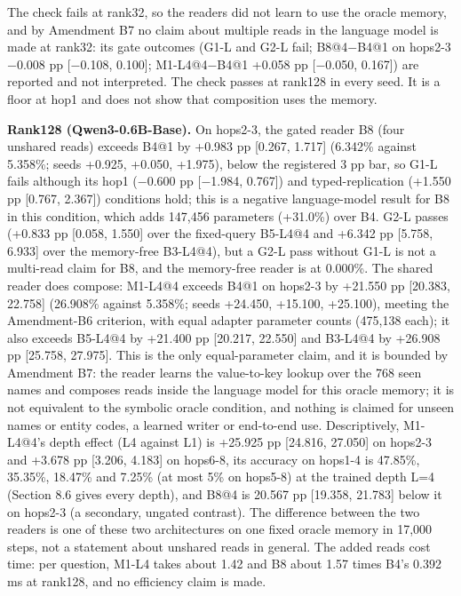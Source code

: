  The check fails at rank32, so the readers did not learn to use the oracle memory, and by Amendment B7 no claim about  %
multiple reads in the language model is made at rank32: its gate outcomes (G1-L and G2-L fail; B8@4\ensuremath{-}B4@1 on hops2-3
\ensuremath{-}0.008 pp [\ensuremath{-}0.108, 0.100]; M1-L4@4\ensuremath{-}B4@1 +0.058 pp [\ensuremath{-}0.050, 0.167]) are reported and not interpreted.  %
The check passes at rank128 in every seed. It is a floor at hop1 and does not show that composition uses the memory.  %

\textbf{Rank128 (Qwen3-0.6B-Base).} On hops2-3, the gated reader B8 (four unshared reads) exceeds B4@1 by +0.983 pp [0.267, 1.717] (6.342\% against
5.358\%; seeds +0.925, +0.050, +1.975), below the registered 3 pp bar, so G1-L fails although its hop1 (\ensuremath{-}0.600 pp
[\ensuremath{-}1.984, 0.767]) and typed-replication (+1.550 pp [0.767, 2.367]) conditions hold; this is a negative language-model result for
B8 in this condition, which adds 147,456 parameters (+31.0\%) over B4. G2-L passes (+0.833 pp [0.058, 1.550]  %
over the fixed-query B5-L4@4 and +6.342 pp [5.758, 6.933] over the memory-free B3-L4@4), but a G2-L pass without G1-L is not a
multi-read claim for B8, and the memory-free reader is at 0.000\%. The shared reader does compose: M1-L4@4  %
exceeds B4@1 on hops2-3 by +21.550 pp [20.383, 22.758] (26.908\% against 5.358\%; seeds +24.450, +15.100, +25.100),
meeting the Amendment-B6 criterion, with equal adapter parameter counts (475,138 each); it also exceeds B5-L4@4 by
+21.400 pp [20.217, 22.550] and B3-L4@4 by +26.908 pp [25.758, 27.975]. This is the only equal-parameter claim, and  %
it is bounded by Amendment B7: the reader learns the value-to-key lookup over the 768 seen names and composes reads inside the
language model for this oracle memory; it is not equivalent to the symbolic oracle condition, and nothing is claimed for unseen
names or entity codes, a learned writer or end-to-end use. Descriptively, M1-L4@4’s depth effect (L4  %
against L1) is +25.925 pp [24.816, 27.050] on hops2-3 and +3.678 pp [3.206, 4.183] on hops6-8, its accuracy on hops1-4 is
47.85\%, 35.35\%, 18.47\% and 7.25\% (at most 5\% on hops5-8) at the trained depth L=4 (Section 8.6 gives every depth), and B8@4 is 20.567 pp [19.358, 21.783] below it on hops2-3
(a secondary, ungated contrast). The difference between the two readers is one of these two architectures  %
on one fixed oracle memory in 17,000 steps, not a statement about unshared reads in general. The  %
added reads cost time: per question, M1-L4 takes about 1.42 and B8 about 1.57 times B4’s 0.392 ms at rank128, and no efficiency
claim is made.  %

